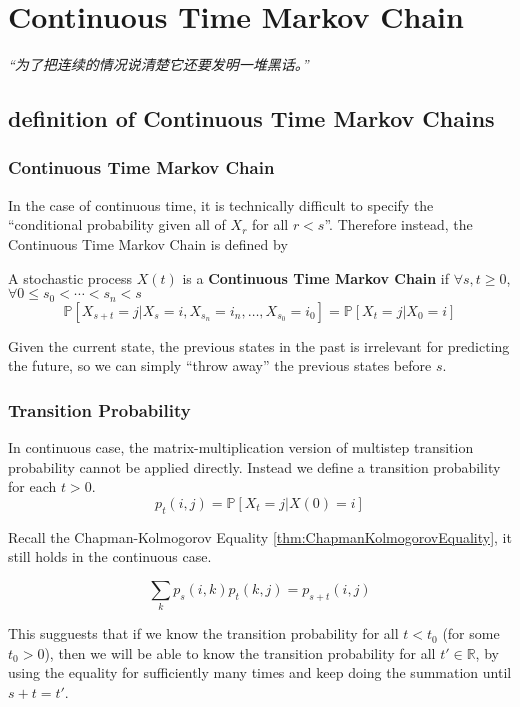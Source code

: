 \chapter{Continuous Time Markov Chain}
\emph{“为了把连续的情况说清楚它还要发明一堆黑话。”}
\newpage


\section{definition of Continuous Time Markov Chains}
    \subsection{Continuous Time Markov Chain}
        In the case of continuous time, it is technically difficult to specify the ``conditional probability given all of $X_r$ for all $r<s$''. Therefore instead, the Continuous Time Markov Chain is defined by

        \begin{definition}\label{def:ContinuousTimeMarkovChain}
            A stochastic process $X(t)$ is a \textbf{Continuous Time Markov Chain} if $\forall s,t \ge 0$, $\forall 0 \le s_0 < \cdots < s_n < s$
            \[ \mathbb{P}[X_{s+t} = j | X_s = i, X_{s_n} = i_n,\dots,X_{s_0}=i_0] = \mathbb{P}[X_t=j | X_0 = i] \]
        \end{definition}

        Given the current state, the previous states in the past is irrelevant for predicting the future, so we can simply ``throw away'' the previous states before $s$.

    \subsection{Transition Probability}
        In continuous case, the matrix-multiplication version of multistep transition probability cannot be applied directly. Instead we define a transition probability for each $t>0$.
        \[ p_t(i,j) = \mathbb{P}[X_t=j|X(0)=i] \]

        Recall the Chapman-Kolmogorov Equality \ref{thm:ChapmanKolmogorovEquality}, it still holds in the continuous case.

        \begin{theorem}\label{thm:ContinuousChapmanKolmogorovEquality}
            \[ \sum_{k}p_s(i,k)p_t(k,j) = p_{s+t}(i,j) \]
        \end{theorem}
        \begin{remark}
            This sugguests that if we know the transition probability for all $t<t_0$ (for some $t_0>0$), then we will be able to know the transition probability for all $t' \in \mathbb{R}$, by using the equality for sufficiently many times and keep doing the summation until $s+t=t'$.
        \end{remark}

